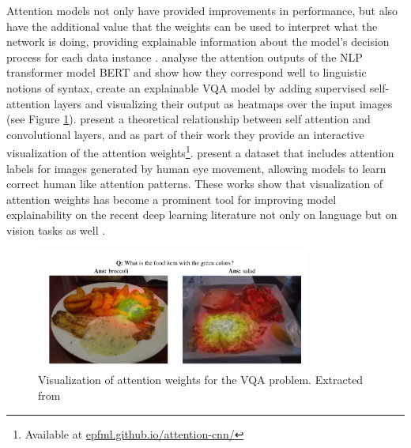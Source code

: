Attention models not only have provided improvements in performance, but also have the additional
value that the weights can be used to interpret what the network is doing, providing
explainable information about the model's decision process for each data instance \cite{wiegreffe_attention}.
 analyse the attention outputs of the NLP transformer model BERT and show how they correspond
well to linguistic notions of syntax,  create an explainable VQA model by adding
supervised self-attention layers and visualizing their output as heatmaps over the input images
(see Figure \ref{fig:vqa}).  present a theoretical  relationship between self attention and convolutional layers, and as part of their work they provide an interactive visualization
of the attention weights\footnote{Available at \url{epfml.github.io/attention-cnn/}}.  present
a dataset that includes attention labels for images generated by human eye movement, allowing models to learn
correct human like attention patterns. 	These works show that visualization of attention weights has become a prominent tool
for improving model explainability on the recent deep learning literature not only on language but on
vision tasks as well \cite{zhang_relation, johnston_depth, carion_object}.



\begin{figure}[ht]
	\begin{center}
	\includegraphics[width=0.8\textwidth]{./figures/soto.png}
	\caption[Attention on VQA]{Visualization of attention weights for the VQA problem. Extracted from  }
	\label{fig:vqa}
	\end{center}
\end{figure}

